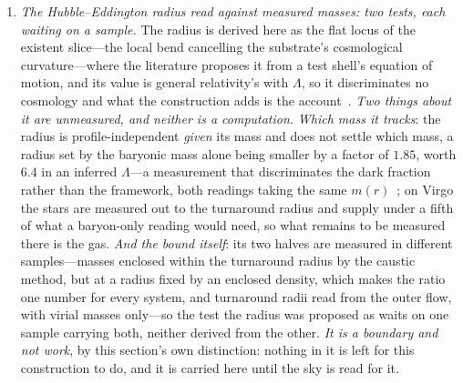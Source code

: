 \documentclass[11pt,a4paper]{article}
\theoremstyle{plain}
\theoremstyle{definition}
\theoremstyle{remark}
\begin{document}
\begin{enumerate}
logarithm's share is moved by the subtraction's own freedom; so the invariant is a stated limit of the reduction,
the difference located in the transverse-traceless sector rather than in the truncation~\cite{JanzenCanonicalTime}. \emph{The tower's closed forms, on which the coefficient rests, are derived from the recoupling
algebra}, as identities in the level that hold at every level~\cite{JanzenCanonicalTime}. \emph{So the definition's
completion is carried to its stated limits rather than left as a verdict this construction could fail}, and each even order otherwise
answers to one operator dimension, which orders spend a constant being settled by the vertex coefficients at that
order exactly as in any effective theory. The results established
here---the classical dynamics, the deparametrized unitary evolution, and the parameter-free closure of the
quantization \emph{ambiguity}---never depended on it, and the ledger's own statement is about the geometric
constants rather than the tower's regularization.

\item\label{frontier:holding} \emph{The Hubble--Eddington radius read against measured masses: two tests, each waiting on a sample.}  The radius is derived here as the flat locus of the existent slice---the local bend cancelling the substrate's cosmological curvature---where the literature proposes it from a test shell's equation of motion, and its value is general relativity's with $\Lambda$, so it discriminates no cosmology and what the construction adds is the account~\cite{JanzenSlicing,PavlidouTomaras2014}.  \emph{Two things about it are unmeasured, and neither is a computation.}  \emph{Which mass it tracks}: the radius is profile-independent \emph{given} its mass and does not settle which mass, a radius set by the baryonic mass alone being smaller by a factor of $1.85$, worth $6.4$ in an inferred $\Lambda$---a measurement that discriminates the dark fraction rather than the framework, both readings taking the same $m(r)$~\cite{JanzenSlicing}; on Virgo the stars are measured out to the turnaround radius and supply under a fifth of what a baryon-only reading would need, so what remains to be measured there is the gas.  \emph{And the bound itself}: its two halves are measured in different samples---masses enclosed within the turnaround radius by the caustic method, but at a radius fixed by an enclosed density, which makes the ratio one number for every system, and turnaround radii read from the outer flow, with virial masses only---so the test the radius was proposed as waits on one sample carrying both, neither derived from the other.  \emph{It is a boundary and not work}, by this section's own distinction: nothing in it is left for this construction to do, and it is carried here until the sky is read for it.


\end{enumerate}
\end{document}
